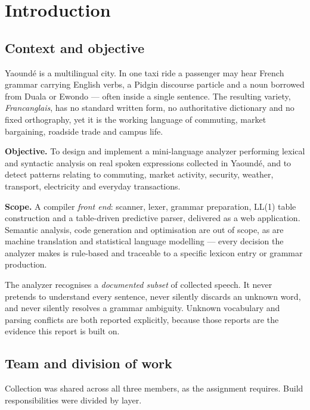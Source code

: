 \section{Introduction}\label{c:intro}

\subsection{Context and objective}

Yaound\'e is a multilingual city. In one taxi ride a passenger may hear French grammar
carrying English verbs, a Pidgin discourse particle and a noun borrowed from Duala or
Ewondo --- often inside a single sentence. The resulting variety, \emph{Francanglais}, has
no standard written form, no authoritative dictionary and no fixed orthography, yet it is
the working language of commuting, market bargaining, roadside trade and campus life.

\textbf{Objective.} To design and implement a mini-language analyzer performing lexical
and syntactic analysis on real spoken expressions collected in Yaound\'e, and to detect
patterns relating to commuting, market activity, security, weather, transport,
electricity and everyday transactions.

\textbf{Scope.} A compiler \emph{front end}: scanner, lexer, grammar preparation, LL(1)
table construction and a table-driven predictive parser, delivered as a web application.
Semantic analysis, code generation and optimisation are out of scope, as are machine
translation and statistical language modelling --- every decision the analyzer makes is
rule-based and traceable to a specific lexicon entry or grammar production.

\begin{keypoint}
The analyzer recognises a \emph{documented subset} of collected speech. It never pretends
to understand every sentence, never silently discards an unknown word, and never silently
resolves a grammar ambiguity. Unknown vocabulary and parsing conflicts are both reported
explicitly, because those reports are the evidence this report is built on.
\end{keypoint}

\subsection{Team and division of work}

Collection was shared across all three members, as the assignment requires. Build
responsibilities were divided by layer.


